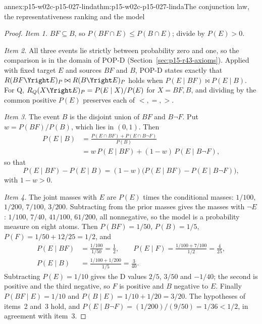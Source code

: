 \begin{annexitem}{annex:p15-w02c-p15-027-linda}{thm:p15-w02c-p15-027-linda}{The conjunction law, the representativeness ranking and the model}
\begin{proof}
\emph{Item 1.} \(BF\subseteq B\), so \(P(BF\cap E)\leq P(B\cap E)\);
divide by \(P(E)>0\).

\emph{Item 2.} All three events lie strictly between probability zero and
one, so the comparison is in the domain of POP-D
(Section~\ref{sec:p15-r43-axioms}). Applied with fixed target \(E\) and
sources \(BF\) and \(B\), POP-D states exactly that
\(R(BF\Yright E)_P\bowtie R(B\Yright E)_P\) holds when
\(P(E\mid BF)\bowtie P(E\mid B)\). For Q,
\(R_Q(X\Yright E)_P=P(E\mid X)/P(E)\) for \(X=BF,B\), and dividing by the
common positive \(P(E)\) preserves each of \(<,=,>\).

\emph{Item 3.} The event \(B\) is the disjoint union of \(BF\) and
\(B\neg F\). Put \(w=P(BF)/P(B)\), which lies in \((0,1)\). Then
\[
\begin{aligned}
 P(E\mid B)&=\frac{P(E\cap BF)+P(E\cap B\neg F)}{P(B)}\\
 &=w\,P(E\mid BF)+(1-w)\,P(E\mid B\neg F),
\end{aligned}
\]
so that
\[
 P(E\mid BF)-P(E\mid B)
 =(1-w)\bigl(P(E\mid BF)-P(E\mid B\neg F)\bigr),
\]
with \(1-w>0\).

\emph{Item 4.} The joint masses with \(E\) are \(P(E)\) times the
conditional masses: \(1/100\), \(1/200\), \(7/100\), \(3/200\). Subtracting
from the prior masses gives the masses with \(\neg E\): \(1/100\),
\(7/40\), \(41/100\), \(61/200\), all nonnegative, so the model is a
probability measure on eight atoms. Then \(P(BF)=1/50\), \(P(B)=1/5\),
\(P(F)=1/50+12/25=1/2\), and
\[
\begin{aligned}
 P(E\mid BF)&=\frac{1/100}{1/50}=\frac12,\qquad
 P(E\mid F)=\frac{1/100+7/100}{1/2}=\frac{4}{25},\\
 P(E\mid B)&=\frac{1/100+1/200}{1/5}=\frac{3}{40}.
\end{aligned}
\]
Subtracting \(P(E)=1/10\) gives the D values \(2/5\), \(3/50\) and
\(-1/40\); the second is positive and the third negative, so \(F\) is
positive and \(B\) negative to \(E\). Finally
\(P(BF\mid E)=1/10\) and \(P(B\mid E)=1/10+1/20=3/20\). The hypotheses of
items~2 and~3 hold, and \(P(E\mid B\neg F)=(1/200)/(9/50)=1/36<1/2\), in
agreement with item~3.
\end{proof}
\end{annexitem}


